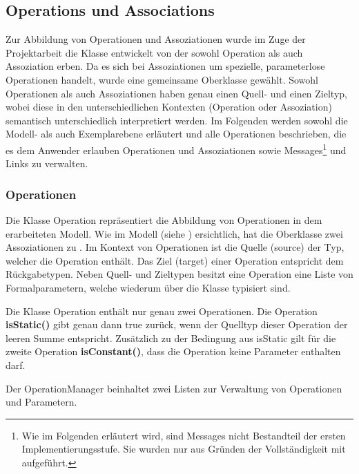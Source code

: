 \subsection{Operations und Associations}

Zur Abbildung von Operationen und Assoziationen wurde im Zuge der Projektarbeit die Klasse  entwickelt von der sowohl Operation als auch Assoziation erben. 
Da es sich bei Assoziationen um spezielle, parameterlose Operationen handelt, wurde eine gemeinsame Oberklasse gewählt.
Sowohl Operationen als auch Assoziationen haben genau einen Quell- und einen Zieltyp, wobei diese in den unterschiedlichen Kontexten (Operation oder Assoziation) semantisch unterschiedlich interpretiert werden. 
Im Folgenden werden sowohl die Modell- als auch Exemplarebene erläutert und alle Operationen beschrieben, die es dem Anwender erlauben Operationen und Assoziationen 
sowie Messages\footnote{Wie im Folgenden erläutert wird, sind Messages nicht Bestandteil der ersten Implementierungsstufe. Sie wurden nur aus Gründen der Vollständigkeit mit aufgeführt.} und Links zu verwalten.  

\subsubsection{Operationen}

Die Klasse Operation repräsentiert die Abbildung von Operationen in dem erarbeiteten Modell.
Wie im Modell (siehe ) ersichtlich, hat die Oberklasse  zwei Assoziationen zu . 
Im Kontext von Operationen ist die Quelle (source) der Typ, welcher die Operation enthält. 
Das Ziel (target) einer Operation entspricht dem Rückgabetypen.
Neben Quell- und Zieltypen besitzt eine Operation eine Liste von Formalparametern, welche 
wiederum über die Klasse  typisiert sind.

Die Klasse Operation enthält nur genau zwei Operationen.
Die Operation \textbf{isStatic()} gibt genau dann true zurück, wenn der Quelltyp dieser Operation der leeren Summe entspricht.
Zusätzlich zu der Bedingung aus isStatic gilt für die zweite Operation \textbf{isConstant()}, dass die Operation keine Parameter enthalten darf. 



Der OperationManager beinhaltet zwei Listen zur Verwaltung von Operationen und Parametern.


